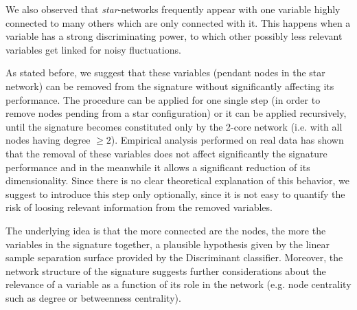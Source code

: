 \documentclass{standalone}
\begin{document}
We also observed that \emph{star}-networks frequently appear with one variable highly connected to many others which are only connected with it.
This happens when a variable has a strong discriminating power, to which other possibly less relevant variables get linked for noisy fluctuations.

As stated before, we suggest that these variables (pendant nodes in the star network) can be removed from the signature without significantly affecting its performance.
The procedure can be applied for one single step (in order to remove nodes pending from a star configuration) or it can be applied recursively, until the signature becomes constituted only by the 2-core network (i.e. with all nodes having degree $\geq2$).
Empirical analysis performed on real data has shown that the removal of these variables does not affect significantly the signature performance and in the meanwhile it allows a significant reduction of its dimensionality.
Since there is no clear theoretical explanation of this behavior, we suggest to introduce this step only optionally, since it is not easy to quantify the risk of loosing relevant information from the removed variables.

The underlying idea is that the more connected are the nodes, the more the variables in the signature  together, a plausible hypothesis given by the linear sample separation surface provided by the Discriminant classifier.
Moreover, the network structure of the signature suggests further considerations about the relevance of a variable as a function of its role in the network (e.g. node centrality such as degree or betweenness centrality).
\end{document}
